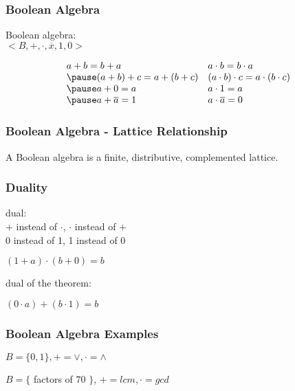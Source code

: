 \documentclass[dvipsnames]{beamer}
\begin{document}
\begin{frame}
  \frametitle{Boolean Algebra}

  \begin{definition}
    \alert{Boolean algebra}:\\
    $<B,+,\cdot,\overline{x},1,0>$

    \pause
    \[\begin{array}{ll}
      a + b = b + a &
      a \cdot b = b \cdot a\\ \pause
      (a + b) + c = a + (b + c) &
      (a \cdot b) \cdot c = a \cdot (b \cdot c)\\ \pause
      a + 0 = a &
      a \cdot 1 = a\\ \pause
      a + \overline{a} = 1 &
      a \cdot \overline{a} = 0
    \end{array}\]
  \end{definition}
\end{frame}

\begin{frame}
  \frametitle{Boolean Algebra - Lattice Relationship}

  \begin{definition}
    A Boolean algebra is a finite, distributive, complemented lattice.
  \end{definition}
\end{frame}

\begin{frame}
  \frametitle{Duality}

  \begin{definition}
    \alert{dual}:\\
    $+$ instead of $\cdot$, $\cdot$ instead of $+$\\
    0 instead of 1, 1 instead of 0
  \end{definition}

  \pause
  \begin{example}
    $(1 + a) \cdot (b + 0) = b$

    dual of the theorem:

    $(0 \cdot a) + (b \cdot 1) = b$
  \end{example}
\end{frame}

\begin{frame}
  \frametitle{Boolean Algebra Examples}

  \begin{example}
    $B = \{0,1\}, + = \vee, \cdot = \wedge$
  \end{example}

  \pause
  \begin{example}
    $B = \{$ factors of $70$ $\}$, $+ = lcm, \cdot = gcd$
  \end{example}
\end{frame}
\end{document}
